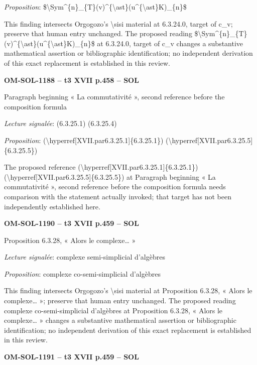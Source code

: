 \emph{Proposition}: \$\textbackslash{}Sym\textasciicircum{}\{n\}\_\{T\}(v)\textasciicircum{}\{\textbackslash{}ast\}(u\textasciicircum{}\{\textbackslash{}ast\}K)\_\{n\}\$\par
This finding intersects Orgogozo's \textbackslash{}sisi material at 6.3.24.0, target of c\_v; preserve that human entry unchanged. The proposed reading \$\textbackslash{}Sym\textasciicircum{}\{n\}\_\{T\}(v)\textasciicircum{}\{\textbackslash{}ast\}(u\textasciicircum{}\{\textbackslash{}ast\}K)\_\{n\}\$ at 6.3.24.0, target of c\_v changes a substantive mathematical assertion or bibliographic identification; no independent derivation of this exact replacement is established in this review.\par
\par\noindent\textbf{OM-SOL-1188 -- t3 XVII p.458 -- SOL}\par
Paragraph beginning « La commutativité », second reference before the composition formula\par
\emph{Lecture signalée}: (6.3.25.1) (6.3.25.4)\par
\emph{Proposition}: (\textbackslash{}hyperref[XVII.par6.3.25.1]\{6.3.25.1\}) (\textbackslash{}hyperref[XVII.par6.3.25.5]\{6.3.25.5\})\par
The proposed reference (\textbackslash{}hyperref[XVII.par6.3.25.1]\{6.3.25.1\}) (\textbackslash{}hyperref[XVII.par6.3.25.5]\{6.3.25.5\}) at Paragraph beginning « La commutativité », second reference before the composition formula needs comparison with the statement actually invoked; that target has not been independently established here.\par
\par\noindent\textbf{OM-SOL-1190 -- t3 XVII p.459 -- SOL}\par
Proposition 6.3.28, « Alors le complexe… »\par
\emph{Lecture signalée}: complexe semi-simplicial d'algèbres\par
\emph{Proposition}: complexe co-semi-simplicial d'algèbres\par
This finding intersects Orgogozo's \textbackslash{}sisi material at Proposition 6.3.28, « Alors le complexe… »; preserve that human entry unchanged. The proposed reading complexe co-semi-simplicial d'algèbres at Proposition 6.3.28, « Alors le complexe… » changes a substantive mathematical assertion or bibliographic identification; no independent derivation of this exact replacement is established in this review.\par
\par\noindent\textbf{OM-SOL-1191 -- t3 XVII p.459 -- SOL}\par
